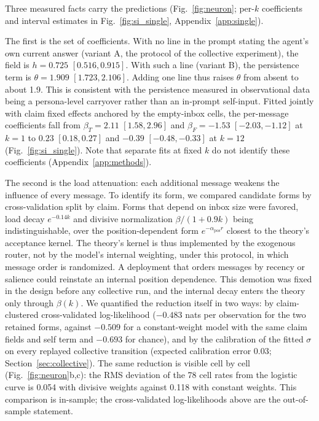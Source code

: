 \documentclass{ieeeaccess}
\begin{document}
Three measured facts carry the predictions (Fig.~\ref{fig:neuron}; per-$k$ coefficients and interval estimates in Fig.~\ref{fig:si_single}, Appendix~\ref{app:single}).

The first is the set of coefficients. With no line in the prompt stating
the agent's own current answer (variant A, the protocol of the collective
experiment), the field is $h = 0.725$ $[0.516, 0.915]$. With such a line
(variant B), the persistence term is $\theta = 1.909$ $[1.723, 2.106]$.
Adding one line thus raises $\theta$ from absent to about 1.9. This is
consistent with the persistence measured in observational data being a
persona-level carryover rather than an in-prompt self-input. Fitted jointly
with claim fixed effects anchored by the empty-inbox cells, the per-message
coefficients fall from $\beta_T = 2.11$ $[1.58, 2.96]$ and
$\beta_F = -1.53$ $[-2.03, -1.12]$ at $k = 1$ to $0.23$ $[0.18, 0.27]$ and
$-0.39$ $[-0.48, -0.33]$ at $k = 12$ (Fig.~\ref{fig:si_single}). Note that separate fits
at fixed $k$ do not identify these coefficients (Appendix~\ref{app:methods}).

The second is the load attenuation: each additional message weakens the
influence of every message. To identify its form, we compared candidate
forms by cross-validation split by claim. Forms that depend on inbox size
were favored, load decay $e^{-0.14k}$ and divisive normalization
$\beta/(1+0.9k)$ being indistinguishable, over the position-dependent form
$e^{-\alpha_{\mathrm{pos}} r}$ closest to the theory's acceptance kernel.
The theory's kernel is thus implemented by the exogenous router, not by the
model's internal weighting, under this protocol, in which message order is
randomized. A deployment that orders messages by recency or salience could
reinstate an internal position dependence. This demotion was fixed in the
design before any collective run, and the internal decay enters the theory
only through $\beta(k)$. We quantified the reduction itself in two ways: by
claim-clustered cross-validated log-likelihood ($-0.483$ nats per
observation for the two retained forms, against $-0.509$ for a
constant-weight model with the same claim fields and self term and $-0.693$
for chance), and by the calibration of the fitted $\sigma$ on every
replayed collective transition (expected calibration error 0.03;
Section~\ref{sec:collective}). The same reduction is visible cell by cell
(Fig.~\ref{fig:neuron}b,c): the RMS deviation of the 78 cell rates from the
logistic curve is 0.054 with divisive weights against 0.118 with constant
weights. This comparison is in-sample; the cross-validated log-likelihoods
above are the out-of-sample statement.
\end{document}
